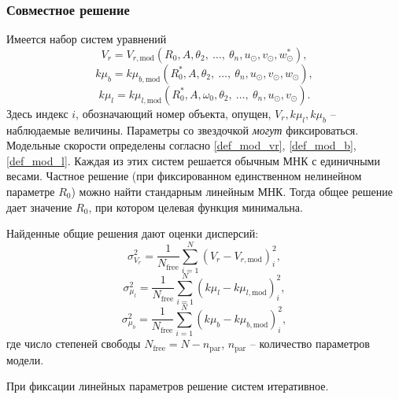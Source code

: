 \documentclass{matmex-diploma-custom}
\begin{document}
\subsubsection{Совместное решение} \label{united_mod}
Имеется набор систем уравнений
\begin{equation} \label{v_r_sys}
                V_r = V_{r, \mathrm{mod}} (R_0, A, \theta_2, \:\ldots,\: \theta_n, u_{\odot}, v_{\odot}, w_{\odot}^{*}),
	\end{equation}
        \begin{equation} \label{b_sys}
                k\mu_b = k\mu_{b, \mathrm{mod}} (R_0^{*}, A, \theta_2, \:\ldots,\: \theta_n, u_{\odot}, v_{\odot}, w_{\odot}),
	\end{equation}
        \begin{equation} \label{l_sys}
                k\mu_l = k\mu_{l, \mathrm{mod}} (R_0^{*}, A, \omega_0, \theta_2, \:\ldots,\: \theta_n, u_{\odot}, v_{\odot}).
	\end{equation}
        Здесь индекс $i$, обозначающий номер объекта, опущен, $V_r, k\mu_l, k\mu_b$ -- наблюдаемые величины. Параметры со звездочкой \textit{могут} фиксироваться. Модельные скорости определены согласно \ref{def_mod_vr}, \ref{def_mod_b}, \ref{def_mod_l}. Каждая из этих систем решается обычным МНК с единичными весами. Частное решение (при фиксированном единственном нелинейном параметре $R_0$) можно найти стандарным линейным МНК. Тогда общее решение дает значение $R_0$, при котором целевая функция минимальна. 
\par Найденные общие решения дают оценки дисперсий:
	\begin{equation}
                \sigma^2_{V_r} = \frac{1}{N_{\mathrm{free}}} \sum^N_{i = 1} \left( V_r - V_{r, \mathrm{mod}} \right)^2_i,
	\end{equation}
	\begin{equation}
                \sigma^2_{\mu_l} = \frac{1}{N_{\mathrm{free}}} \sum^N_{i = 1} \left( k\mu_l - k\mu_{l, \mathrm{mod}} \right)^2_i,
	\end{equation}
	\begin{equation}
                \sigma^2_{\mu_b} = \frac{1}{N_{\mathrm{free}}} \sum^N_{i = 1} \left( k\mu_b - k\mu_{b, \mathrm{mod}} \right)^2_i,
	\end{equation}
        где число степеней свободы $N_{\mathrm{free}} = N - n_{\mathrm{par}}$, $n_{\mathrm{par}}$ -- количество параметров модели.

При фиксации линейных параметров решение систем итеративное. 
\end{document}
